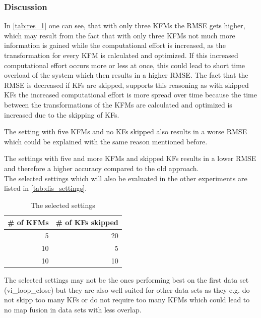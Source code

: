 \subsubsection{Discussion}
In \autoref{tab:res_1} one can see, that with only three \acp{KFM} the \ac{RMSE} gets higher, which may result from the fact that with only three \acp{KFM} not much more information is gained while the computational effort is increased, as the transformation for every \ac{KFM} is calculated and optimized. If this increased computational effort occurs more or less at once, this could lead to short time overload of the system which then results in a higher \ac{RMSE}. The fact that the \ac{RMSE} is decreased if \acp{KF} are skipped, supports this reasoning as with skipped \acp{KF} the increased computational effort is more spread over time because the time between the transformations of the \acp{KFM} are calculated and optimized is increased due to the skipping of \acp{KF}.

The setting with five \acp{KFM} and no \acp{KF} skipped also results in a worse \ac{RMSE} which could be explained with the same reason mentioned before.

The settings with five and more \acp{KFM} and skipped \acp{KF} results in a lower \ac{RMSE} and therefore a higher accuracy compared to the old approach.\\

The selected settings which will also be evaluated in the other experiments are listed in \autoref{tab:dis_settings}.

\begin{table}[ht!]
	\begin{center}
		\begin{tabular}{r|r}
			\# of \acp{KFM} & \# of \acp{KF} skipped  \\ 
			\hline 
			5 & 20 \\ 
			10 & 5 \\ 
			10 & 10 \\ 
		\end{tabular} 
	\end{center}
	\caption{The selected settings}
	\label{tab:dis_settings}
\end{table}

The selected settings may not be the ones performing best on the first data set (vi\_loop\_close) but they are also well suited for other data sets as they e.g. do not skipp too many \acp{KF} or do not require too many \acp{KFM} which could lead to no map fusion in data sets with less overlap.\\


